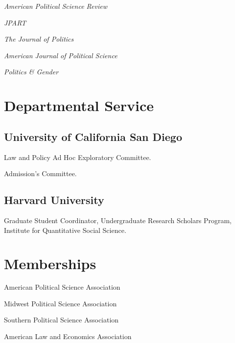 \documentclass[12pt,letterpaper]{report}
\newcommand{\listitemspace}{0.25em}
\renewenvironment{itemize}
{\begin{list}{}{\setlength{\leftmargin}{0em}
                \setlength{\parskip}{0em}
                \setlength{\itemsep}{\listitemspace}
                \setlength{\parsep}{\listitemspace}}}
{\end{list}}
\begin{document}
    \begin{itemize}
        \item[] \emph{American Political Science Review}
        \item[] \emph{JPART}
        \item[] \emph{The Journal of Politics}
        \item[] \emph{American Journal of Political Science}
        \item[] \emph{Politics \& Gender}
    \end{itemize}
    
    \section*{Departmental Service}
    
    \subsection*{University of California San Diego}
    \begin{tablist}
        \item[2021-] \tab{}Law and Policy Ad Hoc Exploratory Committee.
        \item[2020-] \tab{}Admission's Committee.
    \end{tablist}
    
    \subsection*{Harvard University}
    \begin{tablist}
        \item[2015-17] \tab{}Graduate Student Coordinator, Undergraduate Research Scholars Program, Institute for Quantitative Social Science.
    \end{tablist}
    
    

    
    
    \section*{Memberships}
    
    \begin{itemize}
    \item American Political Science Association
    \item Midwest Political Science Association
    \item Southern Political Science Association
    \item American Law and Economics Association    
    \end{itemize}
    
\end{document}
